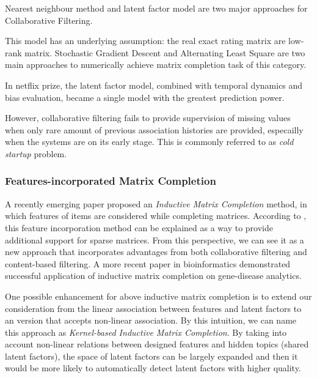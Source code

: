 \documentclass{article} %
\begin{document}
Nearest neighbour method and latent factor model are two major approaches for
Collaborative Filtering.


This model has an underlying assumption: the real exact rating matrix are
low-rank matrix.   
Stochastic Gradient Descent and Alternating Least Square are two main
approaches to numerically achieve matrix completion task of this category.

In netflix prize, the latent factor model, combined with temporal dynamics and
bias evaluation, became a single model with the greatest prediction power.

However, collaborative filtering fails to provide supervision of missing
values when only rare amount of previous association histories are provided,
especailly when the systems are on its early stage.
This is commonly referred to as {\it cold startup} problem.

\subsubsection{Features-incorporated Matrix Completion}
A recently emerging paper proposed an {\it Inductive Matrix Completion} method, in
which features of items are considered while completing matrices. 
According to \cite{jain2013provable}, this feature incorporation method can be
explained as a way to provide additional support for sparse matrices. 
From this perspective, we can see it as a new approach that incorporates
advantages from both collaborative filtering and content-based filtering. 
A more recent paper \cite{natarajan2014inductive} in bioinformatics 
demonstrated successful application of inductive matrix completion on
gene-disease analytics.

One possible enhancement for above inductive matrix completion is to
extend our consideration from the linear association between features and
latent factors to an version that accepts non-linear association.
By this intuition, we can name this approach as 
    {\it Kernel-based Inductive Matrix Completion}.
By taking into account non-linear relations between designed features and hidden
topics (shared latent factors), the space of latent factors can be largely
expanded and then it would be more likely to automatically detect latent
factors with higher quality. 
 
\end{document}
